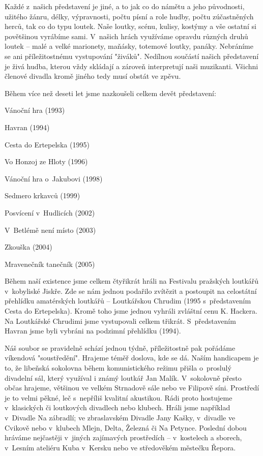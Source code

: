 \documentclass[a5paper, 11pt, twoside]{article}
\begin{document}
Každé z~našich představení je jiné, a to jak co do námětu a jeho
původnosti, užitého žánru, délky, výpravnosti, počtu písní a role hudby,
počtu zúčastněných herců, tak co do typu loutek. Naše loutky, scénu,
kulisy, kostýmy a vše ostatní si povětšinou vyrábíme sami. V~našich
hrách využíváme opravdu různých druhů loutek -- malé a velké marionety,
maňásky, totemové loutky, panáky. Nebráníme se ani příležitostnému
vystupování "živáků". Nedílnou součástí našich představení je živá
hudba, kterou vždy skládají a zároveň interpretují naši muzikanti.
Všichni členové divadla kromě jiného tedy musí obstát ve zpěvu.

Během více než deseti let jsme nazkoušeli celkem devět představení:

\vspace*{6pt}
Vánoční hra (1993)

Havran (1994)

Cesta do Ertepelska (1995)

Vo Honzoj ze Hloty (1996)

Vánoční hra o~Jakubovi (1998)

Sedmero krkavců (1999)

Posvícení v~Hudlicích (2002)

V~Betlémě není místo (2003)

Zkouška (2004)

Mravenečník tanečník (2005)

\vspace*{6pt}

Během naší existence jsme celkem čtyřikrát hráli na Festivalu pražských
loutkářů v~kobyliské Jiskře. Zde se nám jednou podařilo zvítězit a
postoupit na celostátní přehlídku amatérských loutkářů -- Loutkářskou
Chrudim (1995 s~představením Cesta do Ertepelska). Kromě toho jsme
jednou vyhráli zvláštní cenu K. Hackera. Na Loutkářské Chrudimi jsme
vystupovali celkem třikrát. S~představením Havran jsme byli vybráni na
podzimní přehlídku (1994).

Náš soubor se pravidelně schází jednou týdně, příležitostně pak pořádáme
víkendová "soustředění". Hrajeme téměř doslova, kde se dá. Naším
handicapem je to, že libeňská sokolovna během komunistického režimu
přišla o~proslulý divadelní sál, který využíval i známý loutkář Jan
Malík. V~sokolovně přesto občas hrajeme, většinou ve velkém Strnadově
sále nebo ve Filipově síni. Prostředí je to velmi pěkné, leč s~nepříliš
kvalitní akustikou. Rádi proto hostujeme v~klasických či loutkových
divadlech nebo klubech. Hráli jsme například v~Divadle Na zábradlí; ve
zbraslavském Divadle Jany Kašky, v~divadle ve Cvikově nebo v~klubech
Mlejn, Delta, Železná či Na Petynce. Poslední dobou hráváme nejčastěji
v~jiných zajímavých prostředích -- v~kostelech a sborech, v~Lesním
ateliéru Kuba v~Kersku nebo ve středověkém městečku Řepora.
\end{document}
